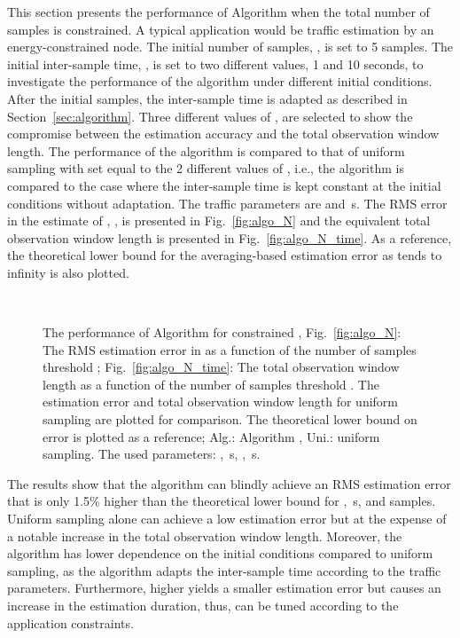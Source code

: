 \documentclass[11pt,draftclsnofoot,journal,onecolumn]{IEEEtran}
\begin{document}
This section presents the performance of Algorithm  when the total number of samples is constrained. A typical application would be traffic estimation by an energy-constrained node. The initial number of samples, , is set to 5 samples. The initial inter-sample time, , is set to two different values, 1 and 10 seconds, to investigate the performance of the algorithm under different initial conditions. After the initial  samples, the inter-sample time is adapted as described in Section~\ref{sec:algorithm}. Three different values of , are selected to show the compromise between the estimation accuracy and the total observation window length. The performance of the algorithm is compared to that of uniform sampling with  set equal to the 2 different values of , i.e., the algorithm is compared to the case where the inter-sample time is kept constant at the initial conditions without adaptation. The traffic parameters are  and \,s. The RMS error in the estimate of , , is presented in Fig.~\ref{fig:algo_N} and the equivalent total observation window length is presented in Fig.~\ref{fig:algo_N_time}. As a reference, the theoretical lower bound for the averaging-based estimation error as  tends to infinity is also plotted. 
\begin{figure}
\centering
{}\\
\caption{The performance of Algorithm  for constrained , Fig.~\ref{fig:algo_N}: The RMS estimation error in  as a function of the number of samples threshold ; Fig.~\ref{fig:algo_N_time}: The total observation window length as a function of the number of samples threshold . The estimation error and total observation window length for uniform sampling are plotted for comparison. The theoretical lower bound on error is plotted as a reference; Alg.: Algorithm , Uni.: uniform sampling. The used parameters: , \,s, , \,s.}
\end{figure}

The results show that the algorithm can blindly achieve an RMS estimation error that is only 1.5\% higher than the theoretical lower bound for , \,s, and  samples. Uniform sampling alone can achieve a low estimation error but at the expense of a notable increase in the total observation window length. Moreover, the algorithm has lower dependence on the initial conditions compared to uniform sampling, as the algorithm adapts the inter-sample time according to the traffic parameters. Furthermore, higher  yields a smaller estimation error but causes an increase in the estimation duration, thus,  can be tuned according to the application constraints.
\end{document}
